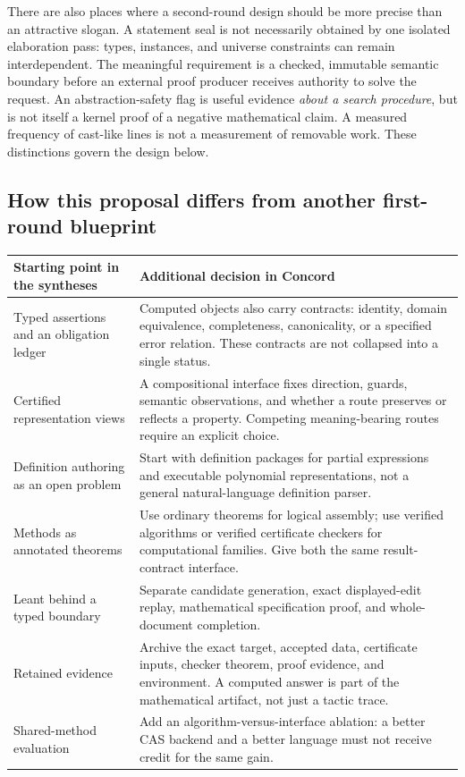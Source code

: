 \documentclass[11pt,a4paper]{article}
\theoremstyle{remark}
\begin{document}
There are also places where a second-round design should be more precise than
an attractive slogan. A statement seal is not necessarily obtained by one
isolated elaboration pass: types, instances, and universe constraints can remain
interdependent. The meaningful requirement is a checked, immutable semantic
boundary before an external proof producer receives authority to solve the
request. An abstraction-safety flag is useful evidence \emph{about a search
procedure}, but is not itself a kernel proof of a negative mathematical claim.
A measured frequency of cast-like lines is not a measurement of removable work.
These distinctions govern the design below.

\subsection{How this proposal differs from another first-round blueprint}
\begin{longtable}{@{}L{.28\textwidth}L{.64\textwidth}@{}}
\toprule
Starting point in the syntheses & Additional decision in Concord \\
\midrule
\endhead
Typed assertions and an obligation ledger & Computed objects also carry contracts:
identity, domain equivalence, completeness, canonicality, or a specified error
relation. These contracts are not collapsed into a single status.\\
Certified representation views & A compositional interface fixes direction,
guards, semantic observations, and whether a route preserves or reflects a
property. Competing meaning-bearing routes require an explicit choice.\\
Definition authoring as an open problem & Start with definition packages for
partial expressions and executable polynomial representations, not a general
natural-language definition parser.\\
Methods as annotated theorems & Use ordinary theorems for logical assembly;
use verified algorithms or verified certificate checkers for computational
families. Give both the same result-contract interface.\\
Leant behind a typed boundary & Separate candidate generation, exact displayed-edit
replay, mathematical specification proof, and whole-document completion.\\
Retained evidence & Archive the exact target, accepted data, certificate inputs,
checker theorem, proof evidence, and environment. A computed answer is part of
the mathematical artifact, not just a tactic trace.\\
Shared-method evaluation & Add an algorithm-versus-interface ablation: a better CAS
backend and a better language must not receive credit for the same gain.\\
\bottomrule
\end{longtable}
\end{document}

